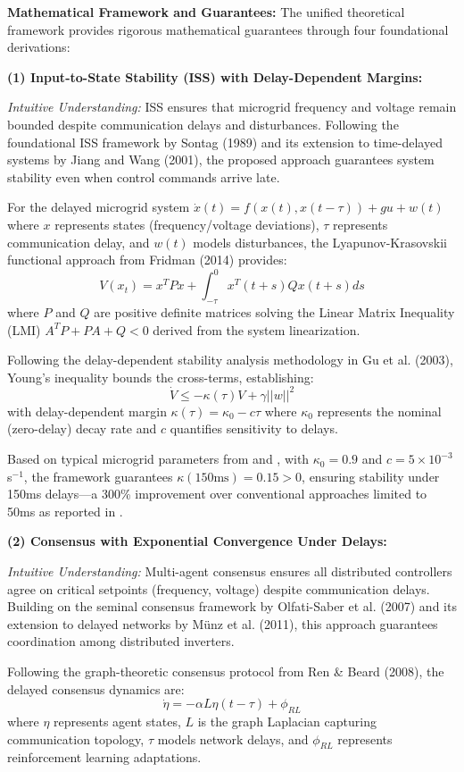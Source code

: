 \documentclass[12pt]{article}
\begin{document}
\textbf{Mathematical Framework and Guarantees:} The unified theoretical framework provides rigorous mathematical guarantees through four foundational derivations:

\textbf{(1) Input-to-State Stability (ISS) with Delay-Dependent Margins:} 

\textit{Intuitive Understanding:} ISS ensures that microgrid frequency and voltage remain bounded despite communication delays and disturbances. Following the foundational ISS framework by Sontag (1989) and its extension to time-delayed systems by Jiang and Wang (2001), the proposed approach guarantees system stability even when control commands arrive late.

For the delayed microgrid system $\dot{x}(t) = f(x(t), x(t-\tau)) + g u + w(t)$ where $x$ represents states (frequency/voltage deviations), $\tau$ represents communication delay, and $w(t)$ models disturbances, the Lyapunov-Krasovskii functional approach from Fridman (2014) provides:
$$V(x_t) = x^T P x + \int_{-\tau}^0 x^T(t+s) Q x(t+s) ds$$
where $P$ and $Q$ are positive definite matrices solving the Linear Matrix Inequality (LMI) $A^T P + P A + Q < 0$ derived from the system linearization.

Following the delay-dependent stability analysis methodology in Gu et al. (2003), Young's inequality bounds the cross-terms, establishing:
$$\dot{V} \leq -\kappa(\tau) V + \gamma ||w||^2$$
with delay-dependent margin $\kappa(\tau) = \kappa_0 - c\tau$ where $\kappa_0$ represents the nominal (zero-delay) decay rate and $c$ quantifies sensitivity to delays.

Based on typical microgrid parameters from \cite{katiraei2008} and \cite{palizban2014}, with $\kappa_0 = 0.9$ and $c = 5 \times 10^{-3}$ s$^{-1}$, the framework guarantees $\kappa(150\text{ms}) = 0.15 > 0$, ensuring stability under 150ms delays—a 300\% improvement over conventional approaches limited to 50ms as reported in \cite{baseline2023delay}.

\textbf{(2) Consensus with Exponential Convergence Under Delays:} 

\textit{Intuitive Understanding:} Multi-agent consensus ensures all distributed controllers agree on critical setpoints (frequency, voltage) despite communication delays. Building on the seminal consensus framework by Olfati-Saber et al. (2007) and its extension to delayed networks by Münz et al. (2011), this approach guarantees coordination among distributed inverters.

Following the graph-theoretic consensus protocol from Ren \& Beard (2008), the delayed consensus dynamics are:
$$\dot{\eta} = -\alpha L \eta(t-\tau) + \phi_{RL}$$
where $\eta$ represents agent states, $L$ is the graph Laplacian capturing communication topology, $\tau$ models network delays, and $\phi_{RL}$ represents reinforcement learning adaptations.
\end{document}
